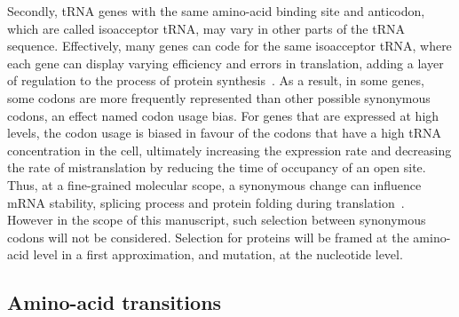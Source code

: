 Secondly, \acrshort{tRNA} genes with the same amino-acid binding site and anticodon, which are called isoacceptor \acrshort{tRNA}, may vary in other parts of the \acrshort{tRNA} sequence.
Effectively, many genes can code for the same isoacceptor \acrshort{tRNA}, where each gene can display varying efficiency and errors in translation, adding a layer of regulation to the process of protein synthesis~\citep{Lowe1997,Chan2008,Juhling2008,Lin2019}.
As a result, in some genes, some codons are more frequently represented than other possible synonymous codons, an effect named codon usage bias.
For genes that are expressed at high levels, the codon usage is biased in favour of the codons that have a high \acrshort{tRNA} concentration in the cell, ultimately increasing the expression rate and decreasing the rate of mistranslation by reducing the time of occupancy of an open site.
Thus, at a fine-grained molecular scope, a synonymous change can influence mRNA stability, splicing process and protein folding during translation~\citep{Plotkin2011, Rak2018}.
However in the scope of this manuscript, such selection between synonymous codons will not be considered.
Selection for proteins will be framed at the amino-acid level in a first approximation, and mutation, at the nucleotide level.

\subsection{Amino-acid transitions}

